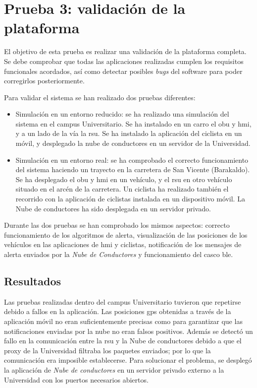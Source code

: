 \section{Prueba 3: validación de la plataforma}
El objetivo de esta prueba es realizar una validación de la plataforma completa. Se debe comprobar que todas las aplicaciones realizadas
cumplen los requisitos funcionales acordados, así como detectar posibles \emph{bugs} del software para poder corregirlos posteriormente.

Para validar el sistema se han realizado dos pruebas diferentes:

\begin{itemize}
	\item Simulación en un entorno reducido: se ha realizado una simulación	del sistema en el campus Universitario. Se ha instalado en un carro el \gls{obu} y \gls{hmi}, y a un lado de la vía la \gls{rsu}. Se ha instalado la aplicación del ciclista en un móvil, y desplegado la nube de conductores en un servidor de la Universidad.
	
	\item Simulación en un entorno real: se ha comprobado el correcto funcionamiento del sistema haciendo un trayecto en la carretera de San Vicente (Barakaldo). Se ha desplegado el \gls{obu} y \gls{hmi}	en un vehículo,	y el \gls{rsu} en otro vehículo situado en el arcén de la carretera. Un ciclista ha realizado también el recorrido con la aplicación de ciclistas instalada en un dispositivo móvil. La Nube de conductores ha sido desplegada en un servidor privado.
\end{itemize}

Durante las dos pruebas se han comprobado los mismos aspectos: correcto funcionamiento de los algoritmos de alerta, visualización de las posiciones de los vehículos en las aplicaciones de \gls{hmi} y ciclistas, notificación de los mensajes de alerta enviados por la \emph{Nube de Conductores} y funcionamiento del casco \gls{ble}.

\subsection{Resultados}
Las pruebas realizadas dentro del campus Universitario tuvieron que repetirse debido a fallos en la aplicación. Las posiciones \gls{gps} obtenidas a través de la aplicación móvil no eran suficientemente precisas como para garantizar que las notificaciones enviadas por la nube no eran falsos positivos. Además se detectó un fallo en la comunicación entre la \gls{rsu} y la Nube de conductores debido a que el proxy de la Universidad filtraba los paquetes enviados; por lo que la comunicación era imposible establecerse. Para solucionar el problema, se desplegó la aplicación de \emph{Nube de conductores} en un servidor privado externo a la Universidad con los puertos necesarios abiertos.

